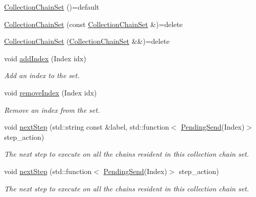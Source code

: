 \begin{DoxyCompactItemize}
\item 
\hyperlink{classvt_1_1messaging_1_1_collection_chain_set_aeb43ad4a2e46ea059817b639b72ddb3b}{Collection\+Chain\+Set} ()=default
\item 
\hyperlink{classvt_1_1messaging_1_1_collection_chain_set_a71328cb5c03210ffdb0bd5dd5f3b6797}{Collection\+Chain\+Set} (const \hyperlink{classvt_1_1messaging_1_1_collection_chain_set}{Collection\+Chain\+Set} \&)=delete
\item 
\hyperlink{classvt_1_1messaging_1_1_collection_chain_set_a21be566436c86fa59a02a1bd073a9e48}{Collection\+Chain\+Set} (\hyperlink{classvt_1_1messaging_1_1_collection_chain_set}{Collection\+Chain\+Set} \&\&)=delete
\item 
void \hyperlink{classvt_1_1messaging_1_1_collection_chain_set_aefc11c9b011b4916c3b80dfc8f776239}{add\+Index} (Index idx)
\begin{DoxyCompactList}\small\item\em Add an index to the set. \end{DoxyCompactList}\item 
void \hyperlink{classvt_1_1messaging_1_1_collection_chain_set_a299e52c482aba47bcdabe796d236c043}{remove\+Index} (Index idx)
\begin{DoxyCompactList}\small\item\em Remove an index from the set. \end{DoxyCompactList}\item 
void \hyperlink{classvt_1_1messaging_1_1_collection_chain_set_aa6ab934f32d8623872cfcd7ed9e147b2}{next\+Step} (std\+::string const \&label, std\+::function$<$ \hyperlink{structvt_1_1messaging_1_1_pending_send}{Pending\+Send}(Index)$>$ step\+\_\+action)
\begin{DoxyCompactList}\small\item\em The next step to execute on all the chains resident in this collection chain set. \end{DoxyCompactList}\item 
void \hyperlink{classvt_1_1messaging_1_1_collection_chain_set_aa4e8a0a24fa7cde6e7f729f4dd002e64}{next\+Step} (std\+::function$<$ \hyperlink{structvt_1_1messaging_1_1_pending_send}{Pending\+Send}(Index)$>$ step\+\_\+action)
\begin{DoxyCompactList}\small\item\em The next step to execute on all the chains resident in this collection chain set. \end{DoxyCompactList}\item 

\end{DoxyCompactItemize}
